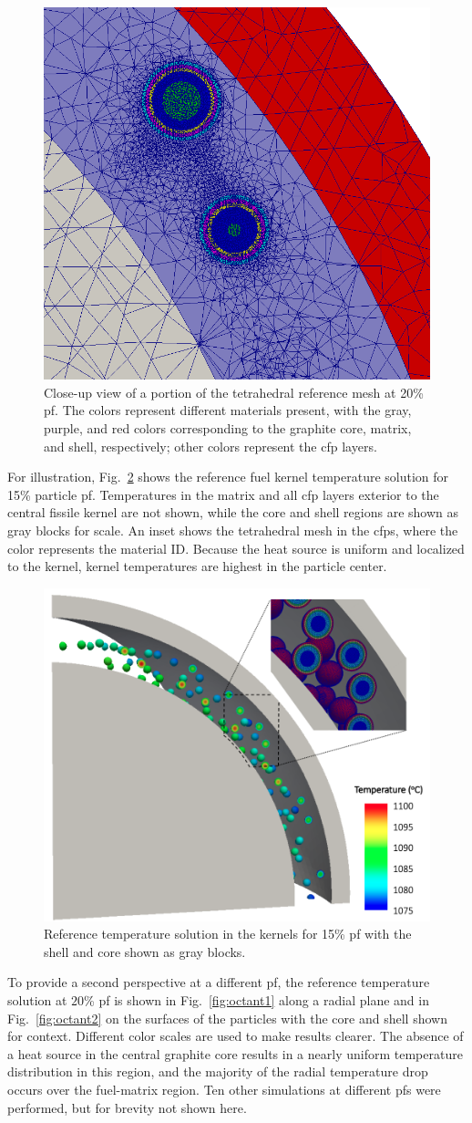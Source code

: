 \begin{figure}[h!]
\centering
\includegraphics[width=0.4\linewidth]{figs/pbfhr_pebble_mesh_cross_section.png}
\caption{Close-up view of a portion of the tetrahedral reference mesh at 20\% \gls{pf}. The colors represent different materials present, with the gray, purple, and red colors corresponding to the graphite core, matrix, and shell, respectively; other colors represent the \gls{cfp} layers.}
\label{fig:pebble_octant_mesh}
\end{figure}

For illustration, Fig.\ \ref{fig:f1} shows the reference fuel kernel temperature solution for 15\% particle \gls{pf}. Temperatures in the matrix and all \gls{cfp} layers exterior to the central fissile kernel are not shown, while the core and shell regions are shown as gray blocks for scale. An inset shows the tetrahedral mesh in the \glspl{cfp}, where the color represents the material ID. Because the heat source is uniform and localized to the kernel, kernel temperatures are highest in the particle center.

\begin{figure}[h!]
\centering
\includegraphics[width=0.5\linewidth]{figs/fhr_fuel1.png}
\caption{Reference temperature solution in the kernels for 15\% \gls{pf} with the shell and core shown as gray blocks.}
\label{fig:f1}
\end{figure}

To provide a second perspective at a different \gls{pf}, the reference temperature solution at \(20\)\% \gls{pf} is shown in Fig.\ \ref{fig:octant1} along a radial plane and in Fig.\ \ref{fig:octant2} on the surfaces of the particles with the core and shell shown for context. Different color scales are used to make results clearer. The absence of a heat source in the central graphite core results in a nearly uniform temperature distribution in this region, and the majority of the radial temperature drop occurs over the fuel-matrix region. Ten other simulations at different \glspl{pf} were performed, but for brevity not shown here.

